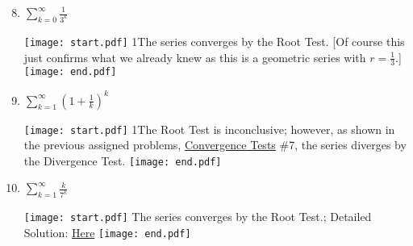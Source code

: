 \documentclass[12pt]{article}
\begin{document}

\begin{enumerate}
\setcounter{enumi}{7}

\item $\sum_{k=0}^{\infty}{\frac{1}{3^k}}$

\texttt{[image: start.pdf]}
{{{1\linewidth}{The series converges by the Root Test. [Of course this just confirms what we already knew as this is a geometric series with $\textstyle r=\frac{1}{3}$.] }}}
\texttt{[image: end.pdf]}


\item $\sum_{k=1}^{\infty}{\left(1+\frac{1}{k}\right)^k}$

\texttt{[image: start.pdf]}
{{{1\linewidth}{The Root Test is inconclusive; however, as shown in the previous assigned problems, \underline{Convergence Tests} \#7, the series diverges by the Divergence Test.}}}
\texttt{[image: end.pdf]}


\item $\sum_{k=1}^{\infty}{\frac{k}{7^k}}$

\texttt{[image: start.pdf]}
{{The series converges by the Root Test.; Detailed Solution: \textcolor{blue}{\href{http://www.math.drexel.edu/classes/Calculus/resources/Math123HW/Solutions/123_09_Comparison_Ratio_Root_Tests_10.pdf}{Here}}}}
\texttt{[image: end.pdf]}
 

\end{enumerate}

\end{document}
